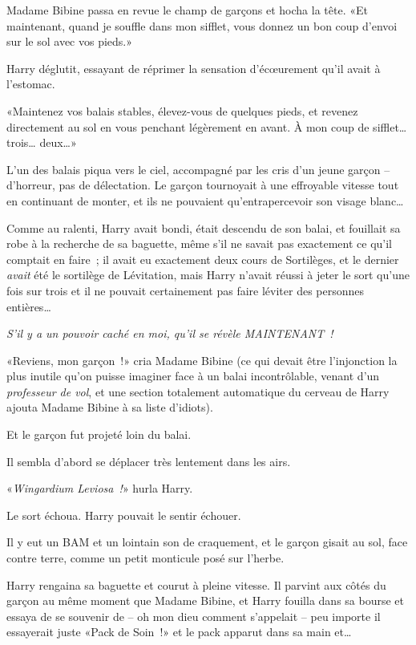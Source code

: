 Madame Bibine passa en revue le champ de garçons et hocha la tête. «Et maintenant, quand je souffle dans mon sifflet, vous donnez un bon coup d'envoi sur le sol avec vos pieds.»

Harry déglutit, essayant de réprimer la sensation d'écœurement qu'il avait à l'estomac.

«Maintenez vos balais stables, élevez-vous de quelques pieds, et revenez directement au sol en vous penchant légèrement en avant. À mon coup de sifflet… trois… deux…»

L'un des balais piqua vers le ciel, accompagné par les cris d'un jeune garçon -- d'horreur, pas de délectation. Le garçon tournoyait à une effroyable vitesse tout en continuant de monter, et ils ne pouvaient qu'entrapercevoir son visage blanc…

Comme au ralenti, Harry avait bondi, était descendu de son balai, et fouillait sa robe à la recherche de sa baguette, même s'il ne savait pas exactement ce qu'il comptait en faire~; il avait eu exactement deux cours de Sortilèges, et le dernier \emph{avait} été le sortilège de Lévitation, mais Harry n'avait réussi à jeter le sort qu'une fois sur trois et il ne pouvait certainement pas faire léviter des personnes entières…

\emph{S'il y a un pouvoir caché en moi, qu'il se révèle MAINTENANT~!}

«Reviens, mon garçon~!» cria Madame Bibine (ce qui devait être l'injonction la plus inutile qu'on puisse imaginer face à un balai incontrôlable, venant d'un \emph{professeur de vol}, et une section totalement automatique du cerveau de Harry ajouta Madame Bibine à sa liste d'idiots).

Et le garçon fut projeté loin du balai.

Il sembla d'abord se déplacer très lentement dans les airs.

«\emph{Wingardium Leviosa~!}» hurla Harry.

Le sort échoua. Harry pouvait le sentir échouer.

Il y eut un BAM et un lointain son de craquement, et le garçon gisait au sol, face contre terre, comme un petit monticule posé sur l'herbe.

Harry rengaina sa baguette et courut à pleine vitesse. Il parvint aux côtés du garçon au même moment que Madame Bibine, et Harry fouilla dans sa bourse et essaya de se souvenir de -- oh mon dieu comment s'appelait -- peu importe il essayerait juste «Pack de Soin~!» et le pack apparut dans sa main et…

